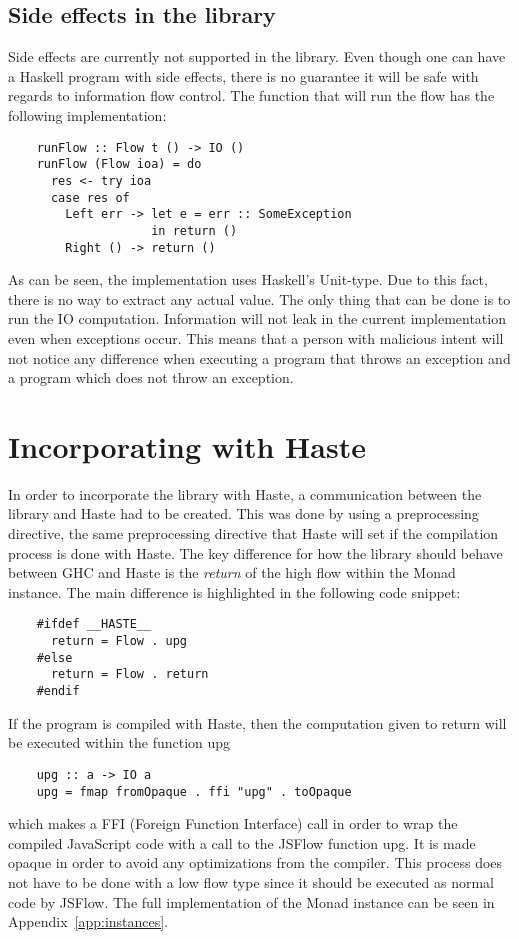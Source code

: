 \subsection{Side effects in the library}
\label{chapter:side-effects-library}
Side effects are currently not supported in the library. Even though one can have a Haskell program with side effects, there is no guarantee it will be safe with regards to information flow control.  The function that will run the flow has the following implementation:
\begin{verbatim}
    runFlow :: Flow t () -> IO ()
    runFlow (Flow ioa) = do
      res <- try ioa
      case res of
        Left err -> let e = err :: SomeException
                    in return ()
        Right () -> return ()
\end{verbatim}
As can be seen, the implementation uses Haskell's Unit-type. Due to this fact, there is no way to extract any actual value. The only thing that can be done is to run the IO computation. Information will not leak in the current implementation even when exceptions occur. This means that a person with malicious intent will not notice any difference when executing a program that throws an exception and a program which does not throw an exception.


\section{Incorporating with Haste}
\label{chapter:incorporating-with-haste}
In order to incorporate the library with Haste, a communication between the library and Haste had to be created. This was done by using a preprocessing directive, the same preprocessing directive that Haste will set if the compilation process is done with Haste. The key difference for how the library should behave between GHC and Haste is the \emph{return} of the high flow within the Monad instance. The main difference is highlighted in the following code snippet:
\begin{verbatim}
    #ifdef __HASTE__
      return = Flow . upg
    #else
      return = Flow . return
    #endif
\end{verbatim}
If the program is compiled with Haste, then the computation given to return will be executed within the function upg
\begin{verbatim}
    upg :: a -> IO a
    upg = fmap fromOpaque . ffi "upg" . toOpaque
\end{verbatim}
which makes a FFI (Foreign Function Interface) call in order to wrap the compiled JavaScript code with a call to the JSFlow function upg. It is made opaque in order to avoid any optimizations from the compiler. This process does not have to be done with a low flow type since it should be executed as normal code by JSFlow. The full implementation of the Monad instance can be seen in Appendix~\ref{app:instances}.

